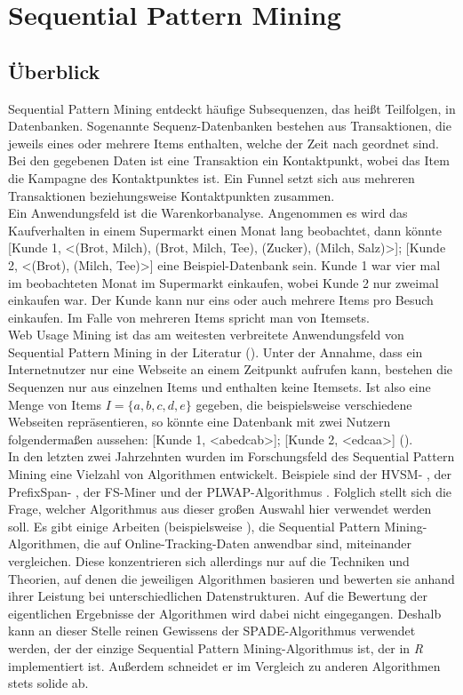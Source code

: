 \section{Sequential Pattern Mining}\label{spm}

\subsection{Überblick}

Sequential Pattern Mining entdeckt häufige Subsequenzen, das heißt Teilfolgen, in Datenbanken. Sogenannte Sequenz-Datenbanken bestehen aus Transaktionen, die jeweils eines oder mehrere Items enthalten, welche der Zeit nach geordnet sind. Bei den gegebenen Daten ist eine Transaktion ein Kontaktpunkt, wobei das Item die Kampagne des Kontaktpunktes ist. Ein Funnel setzt sich aus mehreren Transaktionen beziehungsweise Kontaktpunkten zusammen.\\
Ein Anwendungsfeld ist die Warenkorbanalyse. Angenommen es wird das Kaufverhalten in einem Supermarkt einen Monat lang beobachtet, dann könnte [Kunde 1, <(Brot, Milch), (Brot, Milch, Tee), (Zucker), (Milch, Salz)>]; [Kunde 2, <(Brot), (Milch, Tee)>] eine Beispiel-Datenbank sein. Kunde 1 war vier mal im beobachteten Monat im Supermarkt einkaufen, wobei Kunde 2 nur zweimal einkaufen war. Der Kunde kann nur eins oder auch mehrere Items pro Besuch einkaufen. Im Falle von mehreren Items spricht man von Itemsets.\\
Web Usage Mining ist das am weitesten verbreitete Anwendungsfeld von Sequential Pattern Mining in der Literatur (\cite{lu_ezeife,wang_han,goethals}). Unter der Annahme, dass ein Internetnutzer nur eine Webseite an einem Zeitpunkt aufrufen kann, bestehen die Sequenzen nur aus einzelnen Items und enthalten keine Itemsets. Ist also eine Menge von Items $I = \{a, b, c, d, e\}$ gegeben, die beispielsweise verschiedene Webseiten repräsentieren, so könnte eine Datenbank mit zwei Nutzern folgendermaßen aussehen: [Kunde 1, <abedcab>]; [Kunde 2, <edcaa>] (\cite{taxonomy}).\\
In den letzten zwei Jahrzehnten wurden im Forschungsfeld des Sequential Pattern Mining eine Vielzahl von Algorithmen entwickelt. Beispiele sind der HVSM- \cite{hvsm}, der PrefixSpan- \cite{prefixspan}, der FS-Miner \cite{fsminer} und der PLWAP-Algorithmus \cite{plwap}. Folglich stellt sich die Frage, welcher Algorithmus aus dieser großen Auswahl hier verwendet werden soll. Es gibt einige Arbeiten (beispielsweise \cite{spm_taxonomy1,spm_taxonomy2,spm_taxonomy3,spm_taxonomy4}), die Sequential Pattern Mining-Algorithmen, die auf Online-Tracking-Daten anwendbar sind, miteinander vergleichen. Diese konzentrieren sich allerdings nur auf die Techniken und Theorien, auf denen die jeweiligen Algorithmen basieren und bewerten sie anhand ihrer Leistung bei unterschiedlichen Datenstrukturen. Auf die Bewertung der eigentlichen Ergebnisse der Algorithmen wird dabei nicht eingegangen. Deshalb kann an dieser Stelle reinen Gewissens der SPADE-Algorithmus \cite{spade} verwendet werden, der der einzige Sequential Pattern Mining-Algorithmus ist, der in \textit{R} implementiert ist. Außerdem schneidet er im Vergleich zu anderen Algorithmen stets solide ab.

